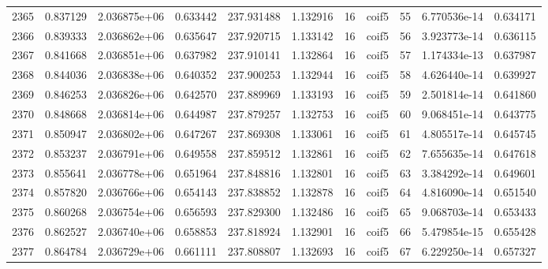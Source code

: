 \begin{tabular}{lrrrrrrlrrr}
2365 &    0.837129 &        2.036875e+06 &  0.633442 &              237.931488 &    1.132916 &      16 &        coif5 &     55 &   6.770536e-14 &      0.634171 \\
2366 &    0.839333 &        2.036862e+06 &  0.635647 &              237.920715 &    1.133142 &      16 &        coif5 &     56 &   3.923773e-14 &      0.636115 \\
2367 &    0.841668 &        2.036851e+06 &  0.637982 &              237.910141 &    1.132864 &      16 &        coif5 &     57 &   1.174334e-13 &      0.637987 \\
2368 &    0.844036 &        2.036838e+06 &  0.640352 &              237.900253 &    1.132944 &      16 &        coif5 &     58 &   4.626440e-14 &      0.639927 \\
2369 &    0.846253 &        2.036826e+06 &  0.642570 &              237.889969 &    1.133193 &      16 &        coif5 &     59 &   2.501814e-14 &      0.641860 \\
2370 &    0.848668 &        2.036814e+06 &  0.644987 &              237.879257 &    1.132753 &      16 &        coif5 &     60 &   9.068451e-14 &      0.643775 \\
2371 &    0.850947 &        2.036802e+06 &  0.647267 &              237.869308 &    1.133061 &      16 &        coif5 &     61 &   4.805517e-14 &      0.645745 \\
2372 &    0.853237 &        2.036791e+06 &  0.649558 &              237.859512 &    1.132861 &      16 &        coif5 &     62 &   7.655635e-14 &      0.647618 \\
2373 &    0.855641 &        2.036778e+06 &  0.651964 &              237.848816 &    1.132801 &      16 &        coif5 &     63 &   3.384292e-14 &      0.649601 \\
2374 &    0.857820 &        2.036766e+06 &  0.654143 &              237.838852 &    1.132878 &      16 &        coif5 &     64 &   4.816090e-14 &      0.651540 \\
2375 &    0.860268 &        2.036754e+06 &  0.656593 &              237.829300 &    1.132486 &      16 &        coif5 &     65 &   9.068703e-14 &      0.653433 \\
2376 &    0.862527 &        2.036740e+06 &  0.658853 &              237.818924 &    1.132901 &      16 &        coif5 &     66 &   5.479854e-15 &      0.655428 \\
2377 &    0.864784 &        2.036729e+06 &  0.661111 &              237.808807 &    1.132693 &      16 &        coif5 &     67 &   6.229250e-14 &      0.657327 \\

\end{tabular}
